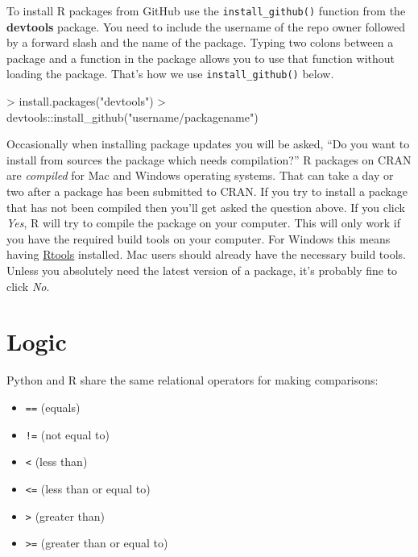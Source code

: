 \documentclass[
]{book}
\newenvironment{Shaded}{\begin{snugshade}}{\end{snugshade}}
\newcommand{\FunctionTok}[1]{\textcolor[rgb]{0.00,0.00,0.00}{#1}}
\newcommand{\NormalTok}[1]{#1}
\newcommand{\SpecialCharTok}[1]{\textcolor[rgb]{0.00,0.00,0.00}{#1}}
\newcommand{\StringTok}[1]{\textcolor[rgb]{0.31,0.60,0.02}{#1}}
\providecommand{\tightlist}{%
  \setlength{\itemsep}{0pt}\setlength{\parskip}{0pt}}
\begin{document}
To install R packages from GitHub use the \texttt{install\_github()} function from the \textbf{devtools} package. You need to include the username of the repo owner followed by a forward slash and the name of the package. Typing two colons between a package and a function in the package allows you to use that function without loading the package. That's how we use \texttt{install\_github()} below.

\begin{Shaded}
\begin{Highlighting}[]
\SpecialCharTok{\textgreater{}} \FunctionTok{install.packages}\NormalTok{(}\StringTok{"devtools"}\NormalTok{)}
\SpecialCharTok{\textgreater{}}\NormalTok{ devtools}\SpecialCharTok{::}\FunctionTok{install\_github}\NormalTok{(}\StringTok{"username/packagename"}\NormalTok{)}
\end{Highlighting}
\end{Shaded}

Occasionally when installing package updates you will be asked, ``Do you want to install from sources the package which needs compilation?'' R packages on CRAN are \emph{compiled} for Mac and Windows operating systems. That can take a day or two after a package has been submitted to CRAN. If you try to install a package that has not been compiled then you'll get asked the question above. If you click \emph{Yes}, R will try to compile the package on your computer. This will only work if you have the required build tools on your computer. For Windows this means having \href{https://cran.r-project.org/bin/windows/Rtools/}{Rtools} installed. Mac users should already have the necessary build tools. Unless you absolutely need the latest version of a package, it's probably fine to click \emph{No}.

\hypertarget{logic}{%
\section{Logic}\label{logic}}

Python and R share the same relational operators for making comparisons:

\begin{itemize}
\tightlist
\item
  \texttt{==} (equals)
\item
  \texttt{!=} (not equal to)
\item
  \texttt{\textless{}} (less than)
\item
  \texttt{\textless{}=} (less than or equal to)
\item
  \texttt{\textgreater{}} (greater than)
\item
  \texttt{\textgreater{}=} (greater than or equal to)
\end{itemize}
\end{document}
